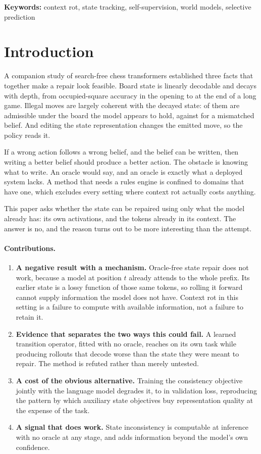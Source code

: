 \documentclass[11pt]{article}
\begin{document}
\noindent\textbf{Keywords:} context rot, state tracking, self-supervision,
world models, selective prediction

\section{Introduction}

A companion study of search-free chess transformers established three facts that
together make a repair look feasible. Board state is linearly decodable and
decays with depth, from  occupied-square accuracy in the
opening to  at the end of a long game. Illegal moves are
largely coherent with the decayed state:  of them are admissible
under the board the model appears to hold, against  for a
mismatched belief. And editing the state representation changes the emitted move,
so the policy reads it.

If a wrong action follows a wrong belief, and the belief can be written, then
writing a better belief should produce a better action. The obstacle is knowing
what to write. An oracle would say, and an oracle is exactly what a deployed
system lacks. A method that needs a rules engine is confined to domains that have
one, which excludes every setting where context rot actually costs anything.

This paper asks whether the state can be repaired using only what the model
already has: its own activations, and the tokens already in its context. The
answer is no, and the reason turns out to be more interesting than the attempt.

\paragraph{Contributions.}
\begin{enumerate}[nosep]
\item \textbf{A negative result with a mechanism.} Oracle-free state repair does
not work, because a model at position $t$ already attends to the whole prefix.
Its earlier state is a lossy function of those same tokens, so rolling it forward
cannot supply information the model does not have. Context rot in this setting is
a failure to compute with available information, not a failure to retain it.
\item \textbf{Evidence that separates the two ways this could fail.} A learned
transition operator, fitted with no oracle, reaches  on its own
task while producing rollouts that decode worse than the state they were meant to
repair. The method is refuted rather than merely untested.
\item \textbf{A cost of the obvious alternative.} Training the consistency
objective jointly with the language model degrades it,
 to  in validation loss, reproducing the
pattern by which auxiliary state objectives buy representation quality at the
expense of the task.
\item \textbf{A signal that does work.} State inconsistency is computable at
inference with no oracle at any stage, and adds information beyond the model's own
confidence.
\end{enumerate}
\end{document}
